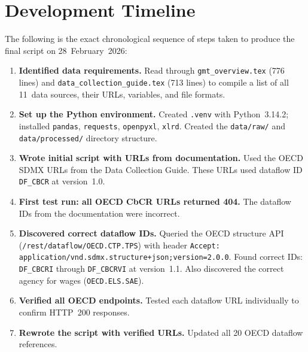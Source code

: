 \documentclass[12pt,a4paper]{article}
\begin{document}
\section{Development Timeline}\label{sec:timeline}

The following is the exact chronological sequence of steps taken to produce the final script on 28~February~2026:

\begin{enumerate}
    \item \textbf{Identified data requirements.}
    Read through \texttt{gmt\_overview.tex} (776 lines) and \texttt{data\_collection\_guide.tex} (713 lines) to compile a list of all 11~data sources, their URLs, variables, and file formats.

    \item \textbf{Set up the Python environment.}
    Created \texttt{.venv} with Python~3.14.2; installed \texttt{pandas}, \texttt{requests}, \texttt{openpyxl}, \texttt{xlrd}.
    Created the \texttt{data/raw/} and \texttt{data/processed/} directory structure.

    \item \textbf{Wrote initial script with URLs from documentation.}
    Used the OECD SDMX URLs from the Data Collection Guide.
    These URLs used dataflow ID \texttt{DF\_CBCR} at version~1.0.

    \item \textbf{First test run: all OECD CbCR URLs returned 404.}
    The dataflow IDs from the documentation were incorrect.

    \item \textbf{Discovered correct dataflow IDs.}
    Queried the OECD structure API (\texttt{/rest/dataflow/OECD.CTP.TPS}) with header \texttt{Accept: application/vnd.sdmx.structure+json;version=2.0.0}.
    Found correct IDs: \texttt{DF\_CBCRI} through \texttt{DF\_CBCRVI} at version~1.1.
    Also discovered the correct agency for wages (\texttt{OECD.ELS.SAE}).

    \item \textbf{Verified all OECD endpoints.}
    Tested each dataflow URL individually to confirm HTTP~200 responses.

    \item \textbf{Rewrote the script with verified URLs.}
    Updated all 20 OECD dataflow references.


\end{enumerate}
\end{document}
